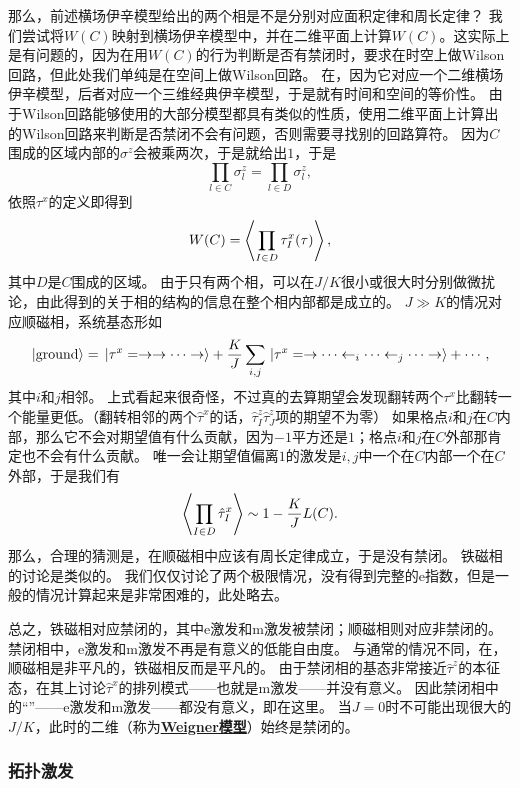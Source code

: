 \documentclass[hyperref, UTF8, a4paper]{ctexart}
\newcommand*{\ee}{\mathrm{e}}
\newcommand*{\concept}[1]{\underline{\textbf{#1}}}
\newcommand*{\Ztwo}{$\mathbb{Z}_2$}
\begin{document}
那么，前述横场伊辛模型给出的两个相是不是分别对应面积定律和周长定律？
我们尝试将$W(C)$映射到横场伊辛模型中，并在二维平面上计算$W(C)$。这实际上是有问题的，因为在用$W(C)$的行为判断是否有禁闭时，要求在时空上做Wilson回路，但此处我们单纯是在空间上做Wilson回路。
在，因为它对应一个二维横场伊辛模型，后者对应一个三维经典伊辛模型，于是就有时间和空间的等价性。
由于Wilson回路能够使用的大部分模型都具有类似的性质，使用二维平面上计算出的Wilson回路来判断是否禁闭不会有问题，否则需要寻找别的回路算符。
因为$C$围成的区域内部的$\sigma^z$会被乘两次，于是就给出$1$，于是
\[
    \prod_{l \in C} \sigma^z_l = \prod_{l \in D} \sigma^z_l,
\]
依照$\tau^x$的定义即得到
\begin{equation}
    W(C) = \expval{\prod_{I \in D} \tau^x_I(\tau)},
\end{equation}
其中$D$是$C$围成的区域。
由于只有两个相，可以在$J/K$很小或很大时分别做微扰论，由此得到的关于相的结构的信息在整个相内部都是成立的。
$J \gg K$的情况对应顺磁相，系统基态形如
\[
    \ket*{\text{ground}} = \ket*{\tau^x = \rightarrow \rightarrow \cdots \rightarrow} + \frac{K}{J} \sum_{i, j} \ket*{\tau^x = \rightarrow \cdots \leftarrow_i \cdots \leftarrow_j \cdots \rightarrow} + \cdots,
\]
其中$i$和$j$相邻。
上式看起来很奇怪，不过真的去算期望会发现翻转两个$\tau^x$比翻转一个能量更低。（翻转相邻的两个$\hat{\tau}^x$的话，$\hat{\tau}^z_I \hat{\tau}^z_J$项的期望不为零）
如果格点$i$和$j$在$C$内部，那么它不会对期望值有什么贡献，因为$-1$平方还是$1$；格点$i$和$j$在$C$外部那肯定也不会有什么贡献。
唯一会让期望值偏离$1$的激发是$i, j$中一个在$C$内部一个在$C$外部，于是我们有
\[
    \expval{\prod_{I \in D} \hat{\tau}^x_I} \sim 1 - \frac{K}{J} L(C).
\]
那么，合理的猜测是，在顺磁相中应该有周长定律成立，于是没有禁闭。
铁磁相的讨论是类似的。 %
我们仅仅讨论了两个极限情况，没有得到完整的$\ee$指数，但是一般的情况计算起来是非常困难的，此处略去。

总之，铁磁相对应禁闭的，其中e激发和m激发被禁闭；顺磁相则对应非禁闭的。禁闭相中，e激发和m激发不再是有意义的低能自由度。
与通常的情况不同，在，顺磁相是非平凡的，铁磁相反而是平凡的。
由于禁闭相的基态非常接近$\hat{\tau}^z$的本征态，在其上讨论$\hat{\tau}^x$的排列模式——也就是m激发——并没有意义。
因此禁闭相中的“”——e激发和m激发——都没有意义，即在这里。
当$J=0$时不可能出现很大的$J/K$，此时的二维（称为\concept{Weigner模型}）始终是禁闭的。

\subsubsection{拓扑激发}\label{sec:z2-topo-excitation}
\end{document}
